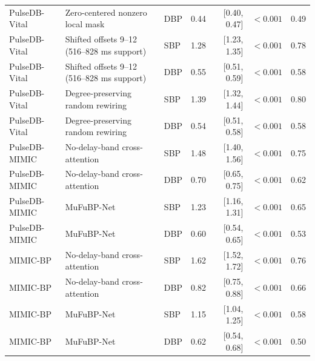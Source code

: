 \documentclass[11pt]{article}
\begin{document}
\begin{table}[H]
{\begin{tabular}{lllrrrr}
PulseDB-Vital & Zero-centered nonzero local mask & DBP & 0.44 & [0.40, 0.47] & $<0.001$ & 0.49 \\
PulseDB-Vital & Shifted offsets 9--12 (516--828 ms support) & SBP & 1.28 & [1.23, 1.35] & $<0.001$ & 0.78 \\
PulseDB-Vital & Shifted offsets 9--12 (516--828 ms support) & DBP & 0.55 & [0.51, 0.59] & $<0.001$ & 0.58 \\
PulseDB-Vital & Degree-preserving random rewiring & SBP & 1.39 & [1.32, 1.44] & $<0.001$ & 0.80 \\
PulseDB-Vital & Degree-preserving random rewiring & DBP & 0.54 & [0.51, 0.58] & $<0.001$ & 0.58 \\
PulseDB-MIMIC & No-delay-band cross-attention & SBP & 1.48 & [1.40, 1.56] & $<0.001$ & 0.75 \\
PulseDB-MIMIC & No-delay-band cross-attention & DBP & 0.70 & [0.65, 0.75] & $<0.001$ & 0.62 \\
PulseDB-MIMIC & MuFuBP-Net & SBP & 1.23 & [1.16, 1.31] & $<0.001$ & 0.65 \\
PulseDB-MIMIC & MuFuBP-Net & DBP & 0.60 & [0.54, 0.65] & $<0.001$ & 0.53 \\
MIMIC-BP & No-delay-band cross-attention & SBP & 1.62 & [1.52, 1.72] & $<0.001$ & 0.76 \\
MIMIC-BP & No-delay-band cross-attention & DBP & 0.82 & [0.75, 0.88] & $<0.001$ & 0.66 \\
MIMIC-BP & MuFuBP-Net & SBP & 1.15 & [1.04, 1.25] & $<0.001$ & 0.58 \\
MIMIC-BP & MuFuBP-Net & DBP & 0.62 & [0.54, 0.68] & $<0.001$ & 0.50 \\
\bottomrule
\end{tabular}}
\end{table}
\end{document}
